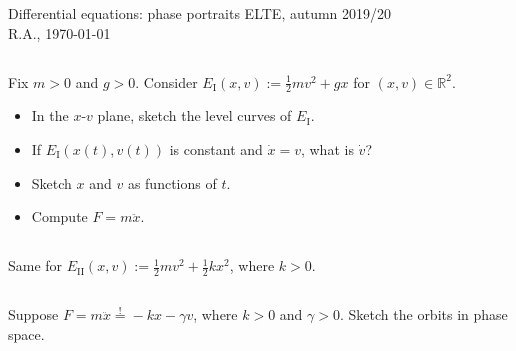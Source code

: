\documentclass[12pt,a4paper]{article}
\newcommand{\IR}{\mathbb{R}}
\begin{document}
    
    Differential equations: phase portraits
    \hfill
    ELTE, autumn 2019/20
    \\
    \hspace*{\fill} {\tiny R.A., \today}
    
    \setcounter{section}{3}
    
    \subsection{}
    
    Fix $m > 0$ and $g > 0$.
    Consider 
    $
        E_\text{I}(x, v) := \tfrac12 m v^2 + g x
    $
    for
    $(x, v) \in \IR^2$.
    \begin{itemize}
    \item 
        In the $x$-$v$ plane,
        sketch the level curves of $E_\text{I}$.
    \item
        If $E_\text{I}(x(t), v(t))$ is constant
        and $\dot{x} = v$, what is $\dot{v}$?
    \item
        Sketch $x$ and $v$ as functions of $t$.
    \item
        Compute $F = m \ddot{x}$.
    \end{itemize}

    \subsection{}
    
    Same for $E_\text{II}(x, v) := \tfrac12 m v^2 + \tfrac12 k x^2$,
    where $k > 0$.
    
    \subsection{}
    
    Suppose $F = m \ddot{x} \stackrel{!}{=} - k x - \gamma v$, where $k > 0$ and $\gamma > 0$.
    Sketch the orbits in phase space.
    
\end{document}
